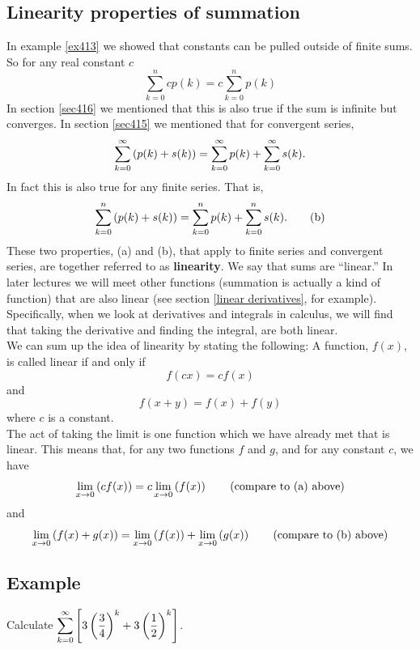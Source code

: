 \subsection{Linearity properties of summation} \label{sec417} \label{linearity}
In example \ref{ex413} we showed that constants can be pulled outside of finite sums. So for any real constant $c$
\[
\sum_{k=0}^n cp(k) = c\sum_{k=0}^n p(k) \tag{a}
\]
In section \ref{sec416} we mentioned that this is also true if the sum is infinite but converges. In section \ref{sec415} we mentioned that for convergent series,
\[
\sum_{k=0}^\infty \left(p(k) + s(k)\right) = \sum_{k=0}^\infty p(k) + \sum_{k=0}^\infty s(k).
\]
In fact this is also true for any finite series. That is,
\[
\sum_{k=0}^n \left(p(k) + s(k)\right) = \sum_{k=0}^n p(k) + \sum_{k=0}^n s(k). \tag{b}
\]
These two properties, (a) and (b), that apply to finite series and convergent series, are together referred to as \textbf{linearity}. We say that sums are ``linear.'' In later lectures we will meet other functions (summation is actually a kind of function) that are also linear (see section \ref{linear derivatives}, for example). Specifically, when we look at derivatives and integrals in calculus, we will find that taking the derivative and  finding the integral, are both linear. \\

\noindent We can sum up the idea of linearity by stating the following: A function, $f(x)$, is called linear if and only if
\[
f(cx) = cf(x) \tag{compare to (a) above}
\] 
and
\[
f(x + y) = f(x) + f(y) \tag{compare to (b) above}
\]
where $c$ is a constant.  \\

\noindent The act of taking the limit is one function which we have already met that is linear. This means that, for any two functions $f$ and $g$, and for any constant $c$, we have
\[
\lim_{x \rightarrow 0} \left(cf(x)\right) = c\lim_{x \rightarrow 0} \left(f(x)\right) \tag{compare to (a) above}
\]
and
\[
\lim_{x \rightarrow 0} \left(f(x) + g(x)\right) = \lim_{x \rightarrow 0} \left(f(x)\right) + \lim_{x \rightarrow 0} \left(g(x)\right) \tag{compare to (b) above}
\]

\subsection{Example}
Calculate $\displaystyle{\sum_{k=0}^\infty\left[3\left(\frac{3}{4}\right)^k + 3\left(\frac{1}{2}\right)^k\right]}$. \\

